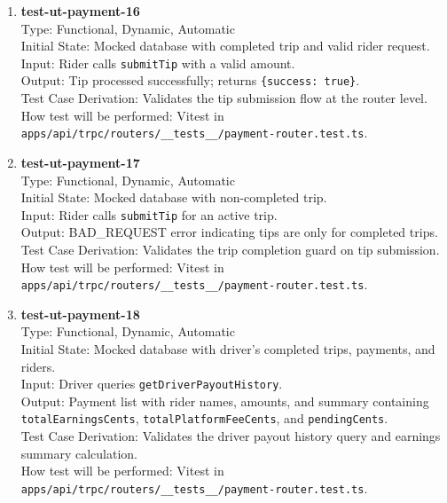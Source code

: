 \documentclass[12pt, titlepage]{article}
\begin{document}
\begin{enumerate}
\item \textbf{test-ut-payment-16}\\
Type: Functional, Dynamic, Automatic\\
Initial State: Mocked database with completed trip and valid rider request.\\
Input: Rider calls \texttt{submitTip} with a valid amount.\\
Output: Tip processed successfully; returns \texttt{\{success: true\}}.\\
Test Case Derivation: Validates the tip submission flow at the router level.\\
How test will be performed: Vitest in \texttt{apps/api/trpc/routers/\_\_tests\_\_/payment-router.test.ts}.\\

\item \textbf{test-ut-payment-17}\\
Type: Functional, Dynamic, Automatic\\
Initial State: Mocked database with non-completed trip.\\
Input: Rider calls \texttt{submitTip} for an active trip.\\
Output: BAD\_REQUEST error indicating tips are only for completed trips.\\
Test Case Derivation: Validates the trip completion guard on tip submission.\\
How test will be performed: Vitest in \texttt{apps/api/trpc/routers/\_\_tests\_\_/payment-router.test.ts}.\\

\item \textbf{test-ut-payment-18}\\
Type: Functional, Dynamic, Automatic\\
Initial State: Mocked database with driver's completed trips, payments, and riders.\\
Input: Driver queries \texttt{getDriverPayoutHistory}.\\
Output: Payment list with rider names, amounts, and summary containing \texttt{totalEarningsCents}, \texttt{totalPlatformFeeCents}, and \texttt{pendingCents}.\\
Test Case Derivation: Validates the driver payout history query and earnings summary calculation.\\
How test will be performed: Vitest in \texttt{apps/api/trpc/routers/\_\_tests\_\_/payment-router.test.ts}.\\


\end{enumerate}
\end{document}
